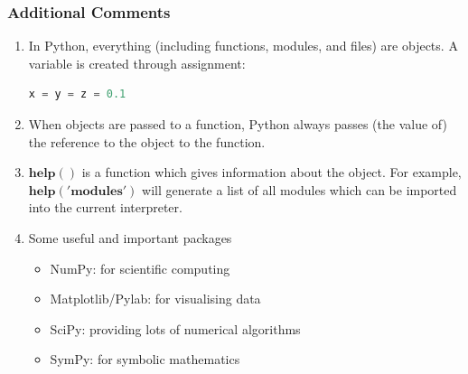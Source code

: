 
\begin{frame}[fragile]
	\MyLogo
	\frametitle{Additional Comments}  
	\small
	
\begin{enumerate}

\item In Python, everything (including functions, modules, and files) are objects. A variable is created through assignment:
\begin{lstlisting}[language=python] 
x = y = z = 0.1
\end{lstlisting}
		
\item When objects are passed to a function, Python always passes (the value of) the reference to the object to the function.
		
\item $\mathbf{help()}$ is a function which gives information about the object. For example, $\mathbf{help('modules')}$ will generate a list of all modules which can be imported into the current interpreter.
		
\item Some useful and important packages
	\begin{itemize}
	\item NumPy: for scientific computing
	\item Matplotlib/Pylab: for visualising data
	\item SciPy: providing lots of numerical algorithms
	\item SymPy: for symbolic mathematics
	\end{itemize}
		
\end{enumerate}


\end{frame}